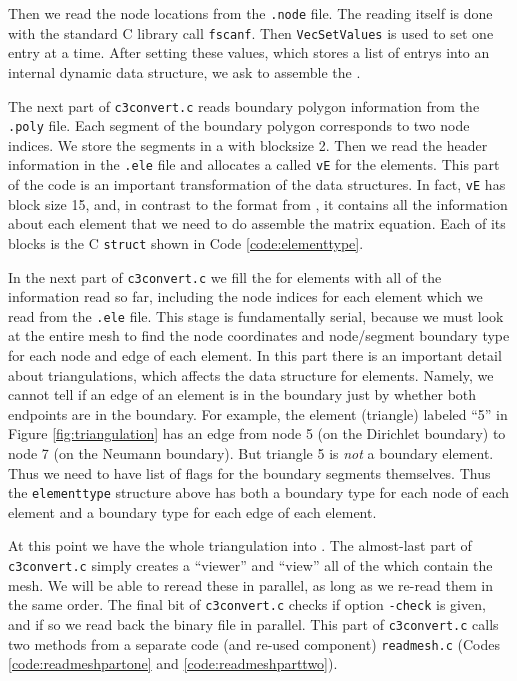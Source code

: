 Then we read the node locations from the \texttt{.node} file.  The reading itself is done with the standard C library call \texttt{fscanf}.  Then \texttt{VecSetValues} is used to set one entry at a time.  After setting these values, which stores a list of entrys into an internal \PETSc dynamic data structure, we ask \PETSc to assemble the \pVecs.

The next part of \texttt{c3convert.c} reads boundary polygon information from the \texttt{.poly} file.  Each segment of the boundary polygon corresponds to two node indices.  We store the segments in a \pVec with blocksize 2.  Then we read the header information in the \texttt{.ele} file and allocates a \pVec called \texttt{vE} for the elements.  This part of the code is an important transformation of the data structures.  In fact, \texttt{vE} has block size 15, and, in contrast to the format from \Triangle, it contains all the information about each element that we need to do assemble the matrix equation.  Each of its blocks is the C \texttt{struct} shown in Code \ref{code:elementtype}.


In the next part of \texttt{c3convert.c} we fill the \pVec for elements with all of the information read so far, including the node indices for each element which we read from the \texttt{.ele} file.  This stage is fundamentally serial, because we must look at the entire mesh to find the node coordinates and node/segment boundary type for each node and edge of each element.  In this part there is an important detail about triangulations, which affects the data structure for elements.  Namely, we cannot tell if an edge of an element is in the boundary just by whether both endpoints are in the boundary.  For example, the element (triangle) labeled ``5'' in Figure \ref{fig:triangulation} has an edge from node 5 (on the Dirichlet boundary) to node 7 (on the Neumann boundary).  But triangle 5 is \emph{not} a boundary element.  Thus we need to have list of flags for the boundary segments themselves.  Thus the \texttt{elementtype} structure above has both a boundary type for each node of each element and a boundary type for each edge of each element.

At this point we have the whole triangulation into \PETSc \pVecs.  The almost-last part of \texttt{c3convert.c} simply creates a \PETSc ``viewer'' and ``view'' all of the \pVecs which contain the mesh.  We will be able to reread these \pVecs in parallel, as long as we re-read them in the same order.  The final bit of \texttt{c3convert.c} checks if option \texttt{-check} is given, and if so we read back the binary file in parallel.  This part of \texttt{c3convert.c} calls two methods from a separate code (and re-used component) \texttt{readmesh.c} (Codes \ref{code:readmeshpartone} and \ref{code:readmeshparttwo}).

